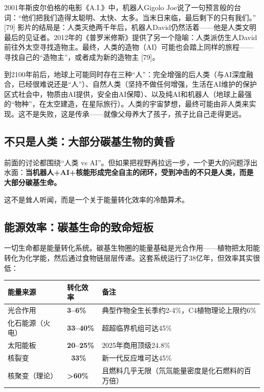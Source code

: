 \documentclass[11pt,a4paper]{ctexart}
\begin{document}
2001年斯皮尔伯格的电影《A.I.》中，机器人Gigolo Joe说了一句预言般的台词：“他们把我们造得太聪明、太快、太多。当末日来临，最后剩下的只有我们。” [79] 影片的结局是：人类灭绝两千年后，机器人David仍然活着——他是人类文明最后的见证者。2012年的《普罗米修斯》提供了另一个隐喻：人类派仿生人David前往外太空寻找造物主。最终，人类的造物（AI）可能也会踏上同样的旅程——寻找自己的“造物主”，或者成为新的造物主 [79]。

到2100年前后，地球上可能同时存在三种“人”：完全增强的后人类（与AI深度融合，已经很难说还是“人”）、自然人类（坚持不做任何增强，生活在AI维护的保护区式社会中，物质由AI提供，安全由AI保障）、以及纯AI和机器人（地球上最强的“物种”，在太空建造，在星际旅行）。人类的宇宙梦想，最终可能由非人类来实现。这不是失败，这是传承——就像父母养大了孩子，孩子比自己走得更远。

\subsection{不只是人类：大部分碳基生物的黄昏}

前面的讨论都围绕“人类 vs AI”。但如果把视野再拉远一步，一个更大的问题浮出水面：\textbf{当机器人+AI+核能形成完全自主的闭环，受到冲击的不只是人类，而是大部分碳基生命。}

这不是耸人听闻，而是一个关于能量转化效率的冷酷算术。

\subsection{能源效率：碳基生命的致命短板}

一切生命都是能量转化系统。碳基生物圈的能量基础是光合作用——植物把太阳能转化为化学能，然后通过食物链层层传递。这套系统运行了38亿年，但效率其实很低：

\begin{center}

\begin{tabularx}{\textwidth}{lXX}
\toprule
能量来源 & 转化效率 & 备注 \\
\midrule
光合作用 & \textbf{3--6\%} & 典型作物全生长季约2-4\%，C4植物理论上限约6\% \\
化石能源（火电） & \textbf{33--40\%} & 超超临界机组可达45\% \\
太阳能板 & \textbf{20--25\%} & 2025年商用顶级24.8\% \\
核裂变 & \textbf{~33\%} & 新一代反应堆可达45\% \\
核聚变（理论） & \textbf{>60\%} & 且燃料几乎无限（氘氚能量密度是化石燃料的百万倍） \\
\bottomrule
\end{tabularx}
\end{center}
\end{document}
